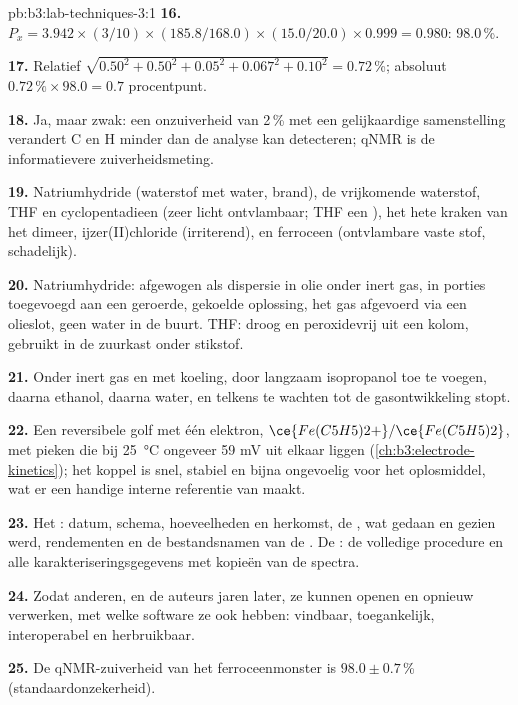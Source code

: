 \begin{solution}{pb:b3:lab-techniques-3:1}
\textbf{16.} $P_x = 3.942 \times (3/10) \times (185.8/168.0) \times (15.0/20.0) \times 0.999 = 0.980$: 98.0\,\%.

\textbf{17.} Relatief $\sqrt{0.50^2 + 0.50^2 + 0.05^2 + 0.067^2 + 0.10^2} = 0.72$\,\%; absoluut $0.72\,\% \times 98.0 = 0.7$ procentpunt.

\textbf{18.} Ja, maar zwak: een onzuiverheid van 2\,\% met een
gelijkaardige samenstelling verandert C en H minder dan de analyse kan
detecteren; qNMR is de informatievere zuiverheidsmeting.

\textbf{19.} Natriumhydride (waterstof met water, brand), de vrijkomende
waterstof, THF en cyclopentadieen (zeer licht ontvlambaar; THF een
), het hete kraken van het dimeer, ijzer(II)chloride
(irriterend), en ferroceen (ontvlambare vaste stof, schadelijk).

\textbf{20.} Natriumhydride: afgewogen als dispersie in olie onder inert
gas, in porties toegevoegd aan een geroerde, gekoelde oplossing, het gas
afgevoerd via een olieslot, geen water in de buurt. THF: droog en
peroxidevrij uit een kolom, gebruikt in de zuurkast onder stikstof.

\textbf{21.} Onder inert gas en met koeling, door langzaam isopropanol
toe te voegen, daarna ethanol, daarna water, en telkens te wachten tot
de gasontwikkeling stopt.

\textbf{22.} Een reversibele golf met één elektron, $\ce{Fe(C5H5)2+}/\ce{Fe(C5H5)2}$, met pieken die bij \qty{25}{\celsius} ongeveer 59 mV
uit elkaar liggen
(\cref{ch:b3:electrode-kinetics}); het koppel is snel, stabiel en bijna
ongevoelig voor het oplosmiddel, wat er een handige interne referentie
van maakt.

\textbf{23.} Het : datum, schema, hoeveelheden en herkomst, de
, wat gedaan en gezien werd, rendementen en de
bestandsnamen van de . De : de
volledige procedure en alle karakteriseringsgegevens met kopieën van de
spectra.

\textbf{24.} Zodat anderen, en de auteurs jaren later, ze kunnen openen en
opnieuw verwerken, met welke software ze ook hebben: vindbaar,
toegankelijk, interoperabel en herbruikbaar.

\textbf{25.} De qNMR-zuiverheid van het ferroceenmonster is $98.0 \pm 0.7$\,\% (standaardonzekerheid).
\end{solution}
